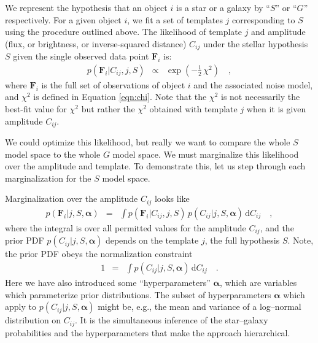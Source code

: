 \documentclass[12pt,preprint]{aastex}
\newcommand{\datavector}[1]{\boldsymbol{#1}}
\newcommand{\flux}{\datavector{F}}
\newcommand{\hyperpars}{\datavector{\alpha}}
\newcommand{\dd}{\mathrm{d}}
\begin{document}
We represent the hypothesis that an object $i$ is a star or a galaxy
by ``$S$'' or ``$G$'' respectively.  For a given object $i$, we fit a
set of templates $j$ corresponding to $S$ using the procedure outlined
above.  The likelihood of template $j$ and amplitude (flux, or
brightness, or inverse-squared distance) $C_{ij}$ under the stellar
hypothesis $S$ given the single observed data point $\flux_i$ is:
\begin{eqnarray}\displaystyle
p(\flux_i|C_{ij},j,S) & \propto & \exp(-\frac{1}{2}\,\chi^2)
\quad ,
\end{eqnarray}
where $\flux_i$ is the full set of observations of object $i$ and the
associated noise model, and $\chi^2$ is defined in Equation \ref{eqn:chi}. Note
that the $\chi^2$ is not necessarily the best-fit value for $\chi^2$
but rather the $\chi^2$ obtained with template $j$ when it is given
amplitude $C_{ij}$.

We could optimize this likelihood, but really we want to compare the
whole $S$ model space to the whole $G$ model space.  We must
marginalize this likelihood over the amplitude and template.  To 
demonstrate this, let us step through each marginalization for the 
$S$ model space.

Marginalization over the amplitude $C_{ij}$ looks like
\begin{eqnarray}\displaystyle
p(\flux_i|j,S,\hyperpars) & = & \int p(\flux_i|C_{ij},j,S)\,p(C_{ij}|j,S,\hyperpars)\,\dd C_{ij}
\quad ,
\end{eqnarray}
where the integral is over all permitted values for the amplitude
$C_{ij}$, and the prior PDF $p(C_{ij}|j,S,\hyperpars)$ depends on the
template $j$, the full hypothesis $S$.  Note, the prior PDF obeys the normalization
constraint
\begin{eqnarray}\displaystyle
1 & = & \int p(C_{ij}|j,S,\hyperpars)\,\dd C_{ij}
\quad .
\end{eqnarray}
\noindent Here we have also introduced some 
``hyperparameters'' $\hyperpars$, which are variables which parameterize 
prior distributions.  The subset of hyperparameters $\hyperpars$ which 
apply to $p(C_{ij}|j,S,\hyperpars)$ might be, e.g., the mean and variance of 
a log--normal distribution on $C_{ij}$.   It is the simultaneous inference
of the star--galaxy probabilities and the hyperparameters that
make the approach hierarchical.  
\end{document}
